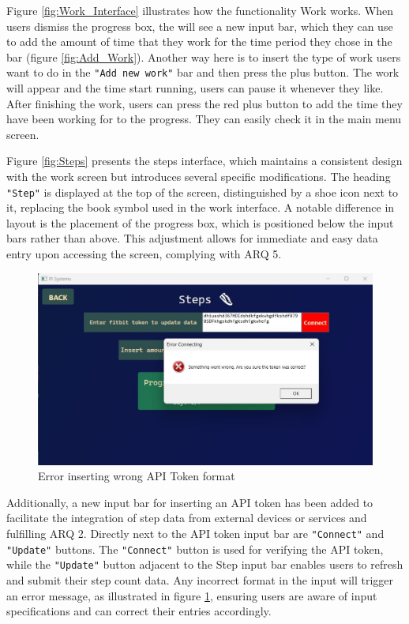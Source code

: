 \documentclass[12pt]{article}
\begin{document}
Figure \ref{fig:Work_Interface} illustrates how the functionality Work works. When users dismiss
the progress box, the will see a new input bar, which they can use to add the amount of time that
they work for the time period they chose in the bar (figure \ref{fig:Add_Work}). Another way here
is to insert the type of work users want to do in the \texttt{"Add new work"} bar and then press 
the plus button. The work will appear and the time start running, users can pause it whenever they
like. After finishing the work, users can press the red plus button to add the time they have been
working for to the progress. They can easily check it in the main menu screen.\par

Figure \ref{fig:Steps} presents the steps interface, which maintains a consistent design
with the work screen but introduces several specific modifications. The heading \texttt{"Step"} is
displayed at the top of the screen, distinguished by a shoe icon next to it, replacing the
book symbol used in the work interface. A notable difference in layout is the placement of
the progress box, which is positioned below the input bars rather than above. This adjustment
allows for immediate and easy data entry upon accessing the screen, complying with ARQ 5.\par

\begin{figure}[!ht]
  \centering
  \includegraphics[width = 0.5\linewidth]{Error}
  \caption{Error inserting wrong API Token format}
  \label{fig:Error}
\end{figure}

Additionally, a new input bar for inserting an API token has been added to facilitate the integration of step data from
external devices or services and fulfilling ARQ 2. Directly next to the API token input bar are \texttt{"Connect"} and 
\texttt{"Update"} buttons. The \texttt{"Connect"} button is used for verifying the API token, while the \texttt{"Update"}
button adjacent to the Step input bar enables users to refresh and submit their step count 
data. Any incorrect format in the input will trigger an error message, as illustrated in 
figure \ref{fig:Error}, ensuring users are aware of input specifications and can correct their entries accordingly.\par
\end{document}
